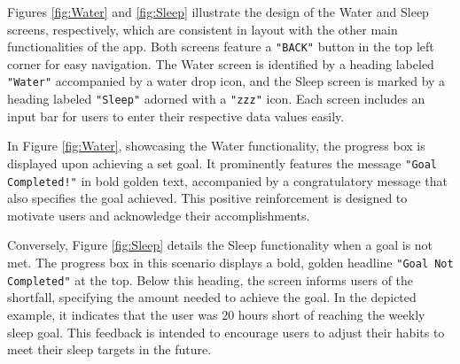 \documentclass[12pt]{article}
\begin{document}
Figures \ref{fig:Water} and \ref{fig:Sleep} illustrate the design of the Water and Sleep screens,
respectively, which are consistent in layout with the other main functionalities of the app. 
Both screens feature a \texttt{"BACK"} button in the top left corner for easy navigation. The Water 
screen is identified by a heading labeled \texttt{"Water"} accompanied by a water drop icon, and the
Sleep screen is marked by a heading labeled \texttt{"Sleep"} adorned with a \texttt{"zzz"} icon. Each screen 
includes an input bar for users to enter their respective data values easily.\par

In Figure \ref{fig:Water}, showcasing the Water functionality, the progress box is displayed
upon achieving a set goal. It prominently features the message \texttt{"Goal Completed!"} in bold 
golden text, accompanied by a congratulatory message that also specifies the goal achieved.
This positive reinforcement is designed to motivate users and acknowledge their accomplishments.\par

Conversely, Figure \ref{fig:Sleep} details the Sleep functionality when a goal is not met.
The progress box in this scenario displays a bold, golden headline \texttt{"Goal Not Completed"} at
the top. Below this heading, the screen informs users of the shortfall, specifying the 
amount needed to achieve the goal. In the depicted example, it indicates that the user 
was 20 hours short of reaching the weekly sleep goal. This feedback is intended to 
encourage users to adjust their habits to meet their sleep targets in the future.\par
\end{document}
